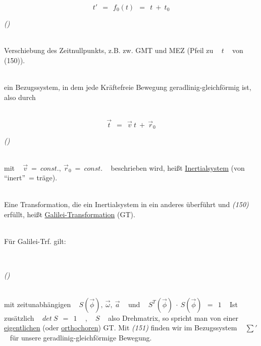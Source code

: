 \documentclass{scrreprt}
\newcounter{ec} %
\newcommand{\iec}{\addtocounter{ec}{1}\begin{flushright}\textit{(\arabic{ec})}\end{flushright}}
\begin{document}
\begin{flushleft}
	\[ t' ~~ = ~~ f_0(t) ~~ = ~~ t ~ + ~ t_0 \]
	
	\iec
	
	~\\
	
	Verschiebung des Zeitnullpunkts, z.B. zw. GMT und MEZ (Pfeil zu ~ $t$ ~ von (150)).
	
	~\\
	
	ein Bezugssystem, in dem jede Kräftefreie Bewegung geradlinig-gleichförmig ist, also durch 
	
	~\\
	
	\[ \vec{t} ~~ = ~~ \vec{v} ~ t ~ + ~ \vec{r}_0 \]
	
	\iec
	
	~\\
	
	mit ~ $\vec{v} ~ = ~ const., ~ \vec{r}_0 ~ = ~ const.$ ~ beschrieben wird, heißt \underline{Inertialsystem} (von \textquotedblleft inert\textquotedblright~= träge).
	
	~\\	
	
	Eine Transformation, die ein Inertialsystem in ein anderes überführt und \textit{(150)} erfüllt, heißt \underline{Galilei-Transformation} (GT).
	
	~\\
	
	Für Galilei-Trf. gilt:
	
	~\\
	

\iec

	~\\
	
	mit zeitunabhängigen ~ $S(\vec{\phi}), ~ \vec{\omega}, ~ \vec{a}$ ~ und ~ $S^T(\vec{\phi}) ~ \cdot ~ S(\vec{\phi}) ~~ = ~~ 1$ ~ Ist zusätzlich ~ $det ~ S ~~ = ~~ 1$ ~ , ~ $S$ ~ also Drehmatrix, so spricht man von einer \underline{eigentlichen} (oder \underline{orthochoren}) GT. Mit \textit{(151)} finden wir im Bezugssystem ~ $\sum'$ ~ für unsere geradlinig-gleichförmige Bewegung.
	
	~\\
	

\end{flushleft}
\end{document}
